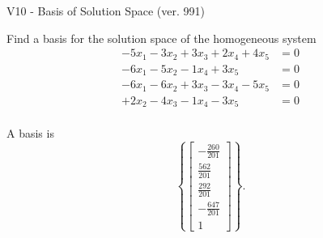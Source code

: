 \begin{exercise}
  \begin{exerciseTitle}V10 - Basis of Solution Space (ver. 991)\end{exerciseTitle}
  \begin{exerciseStatement}
    Find a basis for the solution space of the homogeneous system 
\begin{align*}
 -5 x_ 1 -3 x_ 2 + 3 x_ 3 + 2 x_ 4 + 4 x_ 5 &= 0  \\ 
  -6 x_ 1 -5 x_ 2 -1 x_ 4 + 3 x_ 5 &= 0  \\ 
  -6 x_ 1 -6 x_ 2 + 3 x_ 3 -3 x_ 4 -5 x_ 5 &= 0  \\ 
  + 2 x_ 2 -4 x_ 3 -1 x_ 4 -3 x_ 5 &= 0  \\ 
 \end{align*}


 
  \end{exerciseStatement}

  \begin{exerciseAnswer}
   A basis is   
\[\left\{\left[\begin{array}{c}
-\frac{260}{201} \\
\frac{562}{201} \\
\frac{292}{201} \\
-\frac{647}{201} \\
1
\end{array}\right]\right\}.\]

  


  \end{exerciseAnswer}
\end{exercise}